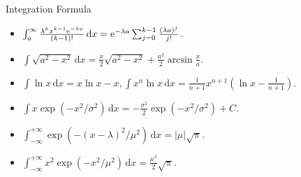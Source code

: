 \documentclass[landscape,a4paper]{article}
\begin{document}
\begin{cheatsheetcolumns}
\begin{card}{Integration Formula}
\begin{itemize}
				\item $\int_a^\infty\frac{\lambda^kx^{k-1}\mathrm{e}^{-\lambda x}}{(k-1)!}\,\mathrm dx=\mathrm{e}^{-\lambda a}\sum_{j=0}^{k-1}\frac{(\lambda a)^j}{j!}$.
				\item $\int\sqrt{a^2-x^2}\,\mathrm dx=\frac{x}{2}\sqrt{a^2-x^2}+\frac{a^2}{2}\arcsin\frac{x}{a}.$
				\item $\int \ln x\,\mathrm dx=x\ln x-x,\int x^n\ln x\,\mathrm dx=\frac{1}{n+1}x^{n+1}\left(\ln x-\frac{1}{n+1}\right).$
				\item $\int x\exp\left(-x^2/\sigma^2\right)\,\mathrm dx=-\frac{\sigma^2}{2}\exp\left(-x^2/\sigma^2\right)+C.$
				\item $\int_{-\infty}^{+\infty} \exp\left(-(x-\lambda)^2/\mu^2\right)\,\mathrm dx=|\mu|\sqrt{\uppi}$.
				\item $\int_{-\infty}^{+\infty}x^2\exp\left(-x^2/\mu^2\right)\,\mathrm dx=\frac{\mu^3}{2}\sqrt{\uppi}.$
			\end{itemize}
		\end{card}
	\end{cheatsheetcolumns}
\end{document}
